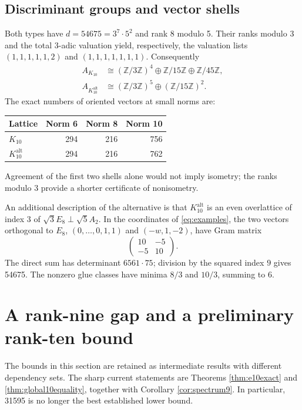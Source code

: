 \documentclass[11pt,a4paper]{article}
\theoremstyle{remark}\newtheorem{remark}[theorem]{Remark}
\newcommand{\Z}{\mathbb Z}\newcommand{\R}{\mathbb R}\newcommand{\F}{\mathbb F}
\newcommand{\Kalt}{K_{10}^{\mathrm{alt}}}
\begin{document}
\subsection{Discriminant groups and vector shells}

Both types have $d=54675=3^7\cdot5^2$ and rank 8 modulo 5. Their ranks modulo 3 and the total $3$-adic valuation yield, respectively, the valuation lists $(1,1,1,1,1,2)$ and $(1,1,1,1,1,1,1)$. Consequently
\begin{align*}
A_{K_{10}}&\cong(\Z/3\Z)^4\oplus\Z/15\Z\oplus\Z/45\Z,\\
A_{\Kalt}&\cong(\Z/3\Z)^5\oplus(\Z/15\Z)^2.
\end{align*}
The exact numbers of oriented vectors at small norms are:
\begin{center}
\begin{tabular}{lrrr}
\toprule
Lattice &Norm 6&Norm 8&Norm 10\\\midrule
$K_{10}$&294&216&756\\
$\Kalt$&294&216&762\\
\bottomrule
\end{tabular}
\end{center}
Agreement of the first two shells alone would not imply isometry; the ranks modulo 3 provide a shorter certificate of nonisometry.

An additional description of the alternative is that $\Kalt$ is an even overlattice of index 3 of $\sqrt3E_8\perp\sqrt5A_2$. In the coordinates of \eqref{eq:examples}, the two vectors orthogonal to $E_8$, $(0,\ldots,0,1,1)$ and $(-w,1,-2)$, have Gram matrix
\[
\begin{pmatrix}10&-5\\-5&10\end{pmatrix}.
\]
The direct sum has determinant $6561\cdot75$; division by the squared index $9$ gives 54675. The nonzero glue classes have minima $8/3$ and $10/3$, summing to 6.

\section{A rank-nine gap and a preliminary rank-ten bound}

The bounds in this section are retained as intermediate results with different dependency sets. The sharp current statements are Theorems \ref{thm:e10exact} and \ref{thm:global10equality}, together with Corollary \ref{cor:spectrum9}. In particular, 31595 is no longer the best established lower bound.
\end{document}
